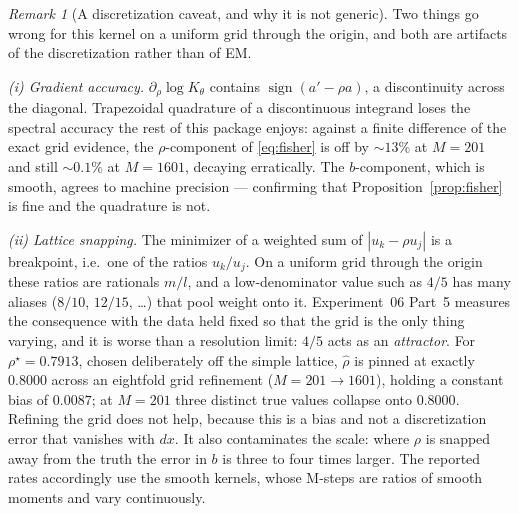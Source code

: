 \documentclass[11pt]{article}
\theoremstyle{remark}
\newtheorem{remark}{Remark}
\begin{document}
\begin{remark}[A discretization caveat, and why it is not generic]
\label{rem:quantization}
Two things go wrong for this kernel on a uniform grid through the origin, and
both are artifacts of the discretization rather than of EM.

\emph{(i) Gradient accuracy.} $\partial_\rho \log K_\theta$ contains
$\operatorname{sign}(a' - \rho a)$, a discontinuity across the diagonal.
Trapezoidal quadrature of a discontinuous integrand loses the spectral accuracy
the rest of this package enjoys: against a finite difference of the exact grid
evidence, the $\rho$-component of \eqref{eq:fisher} is off by $\sim\!13\%$ at
$M = 201$ and still $\sim\!0.1\%$ at $M = 1601$, decaying erratically. The
$b$-component, which is smooth, agrees to machine precision --- confirming that
Proposition~\ref{prop:fisher} is fine and the quadrature is not.

\emph{(ii) Lattice snapping.} The minimizer of a weighted sum of
$|u_k - \rho u_j|$ is a breakpoint, i.e.\ one of the ratios $u_k/u_j$. On a
uniform grid through the origin these ratios are rationals $m/l$, and a
low-denominator value such as $4/5$ has many aliases ($8/10$, $12/15$, \dots)
that pool weight onto it. Experiment~06 Part~5 measures the consequence with
the data held fixed so that the grid is the only thing varying, and it is worse
than a resolution limit: $4/5$ acts as an \emph{attractor}. For
$\rho^\star = 0.7913$, chosen deliberately off the simple lattice, $\hat\rho$ is
pinned at exactly $0.8000$ across an eightfold grid refinement
($M = 201 \to 1601$), holding a constant bias of $0.0087$; at $M = 201$ three
distinct true values collapse onto $0.8000$. Refining the grid does not help,
because this is a bias and not a discretization error that vanishes with $dx$.
It also contaminates the scale: where $\rho$ is snapped away from the truth the
error in $b$ is three to four times larger. The reported rates accordingly use
the smooth kernels, whose M-steps are ratios of smooth moments and vary
continuously.
\end{remark}
\end{document}
